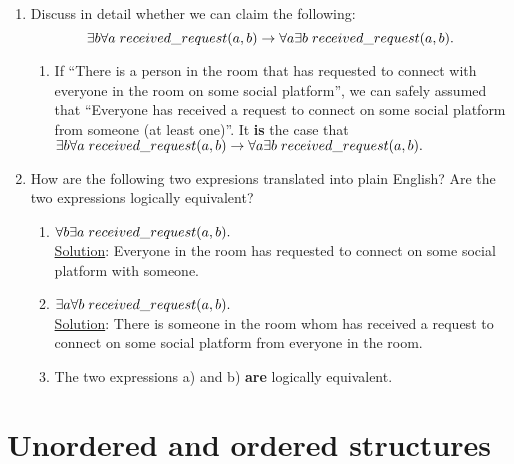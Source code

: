 \documentclass[12pt]{article}
\begin{document}
\begin{enumerate}
\begin{enumerate} [label=\roman*)]
            \end{enumerate}

      \item Discuss in detail whether we can claim the following:
            \[\exists b \forall a \hspace{1mm} received\_request(a,b) \rightarrow \forall a \exists b \hspace{1mm} received\_request(a,b).\]
            \begin{enumerate} [label=\roman*)]
                  \item If ``There is a person in the room that has requested to connect with everyone in the room on some social platform'',
                        \noindent we can safely assumed that ``Everyone has received a request to connect on some social platform from someone (at least one)''.
                        \noindent It {\bf is} the case that \(\exists b \forall a \hspace{1mm} received\_request(a,b) \rightarrow \forall a \exists b \hspace{1mm} received\_request(a,b).\)
            \end{enumerate}
      \item How are the following two expresions translated into plain English? Are the two expressions logically equivalent?
            \begin{enumerate} [label=\alph*)]
                  \item \( \forall b \exists a \hspace{1mm} received\_request(a,b). \)\\
                        \noindent \underline{Solution}: Everyone in the room has requested to connect on some social platform with someone.
                  \item \(\exists a \forall b \hspace{1mm} received\_request(a,b).\)\\
                        \noindent \underline{Solution}: There is someone in the room whom has received a request to connect on some social platform from everyone in the room.
                  \item The two expressions a) and b) {\bf are} logically equivalent.
            \end{enumerate}

\end{enumerate}


\newpage
\section{Unordered and ordered structures}
\end{document}
